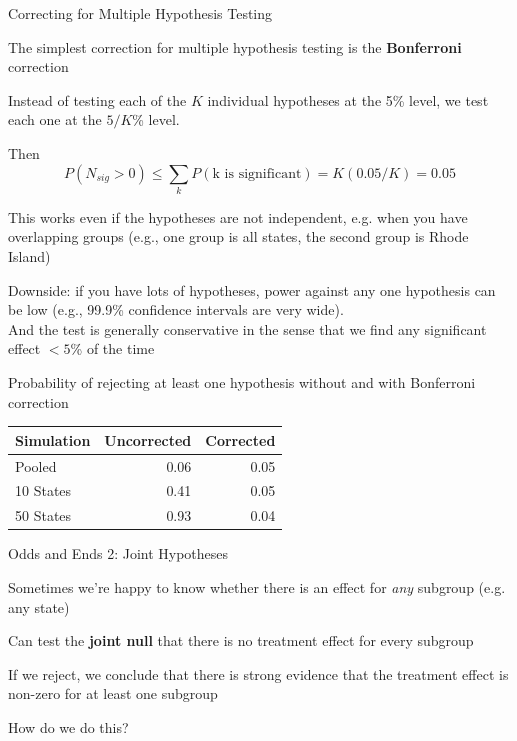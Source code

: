 \documentclass[11pt,english,handout]{beamer}
\newenvironment{wideitemize}{\itemize\addtolength{\itemsep}{10pt}}{\enditemize}
\begin{document}
\begin{frame}{Correcting for Multiple Hypothesis Testing}
\begin{wideitemize}
	\item
	The simplest correction for multiple hypothesis testing is the \textbf{Bonferroni} correction
	
	\pause
	\item
	Instead of testing each of the $K$ individual hypotheses at the 5\% level, we test each one at the $5/K$\% level.
	
	\pause
	\item
	Then 
	$$P( N_{sig} > 0  ) \leq \sum_k P( \text{k is significant}  ) = K (0.05/K) = 0.05 $$
	
	\pause
	\item
	This works even if the hypotheses are not independent, e.g. when you have overlapping groups (e.g., one group is all states, the second group is Rhode Island)
	
	\pause
	\item
	Downside: if you have lots of hypotheses, power against any one hypothesis can be low (e.g., 99.9\% confidence intervals are very wide).\\ \pause{}
	And the test is generally conservative in the sense that we find any significant effect $<5$\% of the time
		
\end{wideitemize}	
\end{frame}


\begin{frame}
	Probability of rejecting at least one hypothesis without and with Bonferroni correction \\
	\begin{tabular}{lrr}
		Simulation & Uncorrected & Corrected \\ \hline
		Pooled & 0.06 & 0.05 \\
		10 States & 0.41 &  0.05 \\
		50 States & 0.93 & 0.04
	\end{tabular}
\end{frame}


\begin{frame}{Odds and Ends 2: Joint Hypotheses}
	\begin{wideitemize}
		\item
		Sometimes we're happy to know whether there is an effect for \textit{any} subgroup (e.g. any state)
		
		\pause
		\item
		Can test the \textbf{joint null} that there is no treatment effect for every subgroup
		
		\pause
		\item
		If we reject, we conclude that there is strong evidence that the treatment effect is non-zero for at least one subgroup
		
		\pause
		\item
		How do we do this? 
		
	\end{wideitemize}	
\end{frame}
\end{document}
